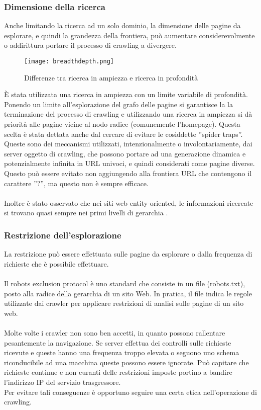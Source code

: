 \subsubsection{Dimensione della ricerca}
Anche limitando la ricerca ad un solo dominio, la dimensione delle pagine da esplorare, e quindi la grandezza della frontiera, può aumentare considerevolmente o addirittura portare il processo di crawling a divergere.

\begin{figure}[htb]
	\centering
	\texttt{[image: breadthdepth.png]}
	\caption{Differenze tra ricerca in ampiezza e ricerca in profondità}
	\label{breadthsearch}
\end{figure}

È stata utilizzata una ricerca in ampiezza con un limite variabile di profondità. Ponendo un limite all'esplorazione del grafo delle pagine si garantisce la la terminazione del processo di crawling e utilizzando una ricerca in ampiezza si dà priorità alle pagine vicine al nodo radice (comunemente l'homepage). Questa scelta è stata dettata anche dal cercare di evitare le cosiddette ''spider traps''. Queste sono dei meccanismi utilizzati, intenzionalmente o involontariamente, dai server oggetto di crawling, che possono portare ad una generazione dinamica e potenzialmente infinita in URL univoci, e quindi considerati come pagine diverse. Questo può essere evitato non aggiungendo alla frontiera URL che contengono il carattere ''?'', ma questo non è sempre efficace.
\\\\
Inoltre è stato osservato che nei siti web entity-oriented, le informazioni ricercate si trovano quasi sempre nei primi livelli di gerarchia \cite{He13}.

\subsubsection{Restrizione dell'esplorazione}
La restrizione può essere effettuata sulle pagine da esplorare o dalla frequenza di richieste che è possibile effettuare.
\\\\
Il robots exclusion protocol è uno standard che consiste in un file (robots.txt), posto alla radice della gerarchia di un sito Web. In pratica, il file indica le regole utilizzate dai crawler per applicare restrizioni di analisi sulle pagine di un sito web. 
\\\\
Molte volte i crawler non sono ben accetti, in quanto possono rallentare pesantemente la navigazione. Se server effettua dei controlli sulle richieste ricevute e queste hanno una frequenza troppo elevata o seguono uno schema riconducibile ad una macchina queste possono essere ignorate. Può capitare che richieste continue e non curanti delle restrizioni imposte portino a bandire l'indirizzo IP del servizio trasgressore.\\
Per evitare tali conseguenze è opportuno seguire una certa etica nell'operazione di crawling.

